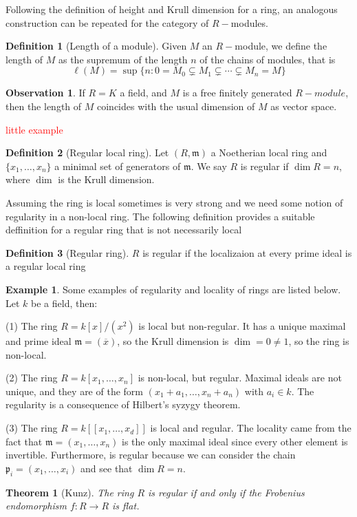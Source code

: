 \documentclass[leqno]{article}
\newtheorem{theorem}{Theorem}[section]
\theoremstyle{definition}
\newtheorem{definition}{Definition}[section]
\newtheorem{observation}{Observation}[section]
\newtheorem{example}{Example}[section]
\newcommand{\com}[1]{\textcolor{red}{#1}}
\begin{document}
Following the definition of height and Krull dimension for a ring, an analogous construction can be repeated for the category of $R-$modules.

\begin{definition}[Length of a module] Given $M$ an $R-$module, we define the length of  $M$ as the supremum of the length $n$ of the chains of modules, that is
  \[
	\ell(M)= \sup \{n: 0 = M_0\subsetneq M_1 \subsetneq \cdots \subsetneq M_n = M\}
  \] 

\end{definition}

\begin{observation} If $R = K$ a field, and $M$ is a free finitely generated $R-module$, then the length of  $M$ coincides with the usual dimension of $M$ as vector space.
\end{observation}

\com{little example}

\begin{definition}[Regular local ring] Let $(R, \mathfrak{m})$ a Noetherian local ring and $\{x_1, \ldots, x_n\}$ a minimal set of generators of $\mathfrak{m}$. We say $R$ is regular if $\dim R=n$, where  $\dim$ is the Krull dimension.
\end{definition}

Assuming the ring is local sometimes is very strong and we need some notion of regularity in a non-local ring. The following definition provides a suitable deffinition for a regular ring that is not necessarily local
\begin{definition}[Regular ring] $R$ is regular if the localizaion at every prime ideal is a regular local ring
\end{definition}

\begin{example} Some examples of regularity and locality of rings are listed below. Let $k$ be a field, then:

  (1) The ring $R = k[x] / (x^2)$ is local but non-regular. It has a unique maximal and prime ideal  $\mathfrak{m}=(\overline{x})$, so the Krull dimension is $\dim = 0\neq 1$, so the ring is non-local.

  (2) The ring $R = k[x_1, \ldots, x_n]$ is non-local, but regular. Maximal ideals are not unique, and they are of the form $(x_1+a_1, \ldots, x_n+a_n)$ with  $a_i\in k$. The regularity is a consequence of Hilbert's syzygy theorem.

  (3) The ring $R = k[[x_1, \ldots, x_d]]$ is local and regular. The locality came from the fact that $\mathfrak{m} = (x_1, \ldots, x_n)$ is the only maximal ideal since every other element is invertible. Furthermore, is regular because we can consider the chain $\mathfrak{p}_i = (x_1, \ldots, x_i)$ and see that $\dim R = n$.
\end{example}

\begin{theorem}[Kunz] The ring  $R$ is regular if and only if the Frobenius endomorphism $f:R\to R$ is flat.
\end{theorem}



\nocite{*}


\end{document}
